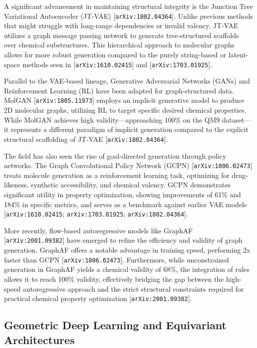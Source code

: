 \documentclass[11pt]{article}
\begin{document}
A significant advancement in maintaining structural integrity is the Junction Tree Variational Autoencoder (JT-VAE) [\texttt{arXiv:1802.04364}]. Unlike previous methods that might struggle with long-range dependencies or invalid valency, JT-VAE utilizes a graph message passing network to generate tree-structured scaffolds over chemical substructures. This hierarchical approach to molecular graphs allows for more robust generation compared to the purely string-based or latent-space methods seen in [\texttt{arXiv:1610.02415}] and [\texttt{arXiv:1703.01925}].

Parallel to the VAE-based lineage, Generative Adversarial Networks (GANs) and Reinforcement Learning (RL) have been adapted for graph-structured data. MolGAN [\texttt{arXiv:1805.11973}] employs an implicit generative model to produce 2D molecular graphs, utilizing RL to target specific desired chemical properties. While MolGAN achieves high validity—approaching 100\% on the QM9 dataset—it represents a different paradigm of implicit generation compared to the explicit structural scaffolding of JT-VAE [\texttt{arXiv:1802.04364}].

The field has also seen the rise of goal-directed generation through policy networks. The Graph Convolutional Policy Network (GCPN) [\texttt{arXiv:1806.02473}] treats molecule generation as a reinforcement learning task, optimizing for drug-likeness, synthetic accessibility, and chemical valency. GCPN demonstrates significant utility in property optimization, showing improvements of 61\% and 184\% in specific metrics, and serves as a benchmark against earlier VAE models [\texttt{arXiv:1610.02415}; \texttt{arXiv:1703.01925}; \texttt{arXiv:1802.04364}].

More recently, flow-based autoregressive models like GraphAF [\texttt{arXiv:2001.09382}] have emerged to refine the efficiency and validity of graph generation. GraphAF offers a notable advantage in training speed, performing 2x faster than GCPN [\texttt{arXiv:1806.02473}]. Furthermore, while unconstrained generation in GraphAF yields a chemical validity of 68\%, the integration of rules allows it to reach 100\% validity, effectively bridging the gap between the high-speed autoregressive approach and the strict structural constraints required for practical chemical property optimization [\texttt{arXiv:2001.09382}].

\subsection{Geometric Deep Learning and Equivariant Architectures}
\end{document}
